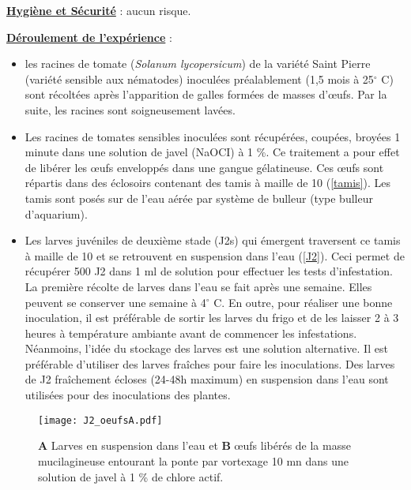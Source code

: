         
\noindent \textbf{ \underline{Hygiène et Sécurité} } : aucun risque. 

\noindent \textbf{ \underline{Déroulement de l'expérience} } : 


\begin{itemize}[ label=]
\item les racines de tomate (\textit{Solanum lycopersicum}) de la variété Saint Pierre (variété sensible aux nématodes)  
     inoculées préalablement (1,5 mois à 25$^{\circ}$ C) sont récoltées après l'apparition de galles formées de masses    
     d’œufs. Par la suite, les racines sont  soigneusement
     lavées.
\end{itemize}

\begin{itemize}[ label=]
\item Les racines de tomates sensibles inoculées sont récupérées, coupées, broyées 1 minute  dans une solution de javel 
    (NaOCI) à 1 \%. Ce traitement a pour effet de libérer les œufs enveloppés dans une gangue
	gélatineuse. Ces œufs sont répartis dans des éclosoirs  contenant des  tamis à maille de 10 \si{\micron}
	(\autoref{tamis}). Les tamis sont posés sur de l'eau aérée par système de bulleur (type bulleur d'aquarium).
\end{itemize}

\begin{itemize}[ label=]
\item  Les larves juvéniles de deuxième stade (J2s) qui  émergent traversent  ce tamis à maille de 10  \si{\micron} et
	se retrouvent en suspension dans l'eau (\autoref{J2}).  Ceci permet de récupérer
	500 J2 dans 1 ml de solution pour effectuer les tests d’infestation. La première récolte de larves dans l’eau se 
	fait après une semaine. Elles
	peuvent se conserver une semaine à 4$^{\circ}$ C. En outre,   pour réaliser une bonne inoculation, il est 
	préférable de sortir les larves du frigo et de les
	laisser 2 à 3 heures à température ambiante avant de commencer les infestations. Néanmoins, l'idée du stockage des 
	larves est une solution alternative. Il est préférable d'utiliser des larves fraîches pour faire les inoculations. 
	Des larves de J2 fraîchement écloses (24-48h maximum) en suspension dans l'eau sont utilisées pour des inoculations 
	des plantes.
\end{itemize}

\begin{figure}[H]
	\centering \texttt{[image: J2\_oeufsA.pdf]}
	\caption[ (A) Larves en suspension dans l’eau et (B) œufs libérés de la masse
     	mucilagineuse entourant la ponte.]{ \textbf{A} Larves en suspension dans l’eau et \textbf{B} œufs libérés de la 
	    masse mucilagineuse entourant la ponte par
	    vortexage 10 mn dans une solution de javel à 1 \% de chlore actif.}
    \label{J2}
\end{figure}


